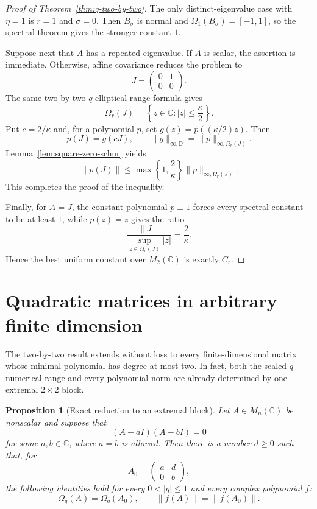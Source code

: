 \documentclass[11pt]{article}
\newtheorem{proposition}[theorem]{Proposition}
\theoremstyle{remark}
\begin{document}
\begin{proof}[Proof of Theorem~\ref{thm:q-two-by-two}]
The only distinct-eigenvalue case with \(\eta=1\) is
\(r=1\) and \(\sigma=0\).  Then \(B_\sigma\) is normal and
\(\Omega_1(B_\sigma)=[-1,1]\), so the spectral theorem gives the
stronger constant \(1\).

Suppose next that \(A\) has a repeated eigenvalue.  If \(A\) is scalar,
the assertion is immediate.  Otherwise, affine covariance reduces the
problem to
\[
  J=
  \begin{pmatrix}
    0&1\\
    0&0
  \end{pmatrix}.
\]
The same two-by-two \(q\)-elliptical range formula gives
\[
  \Omega_r(J)=
  \left\{z\in\mathbb C:|z|\leq\frac{\kappa}{2}\right\}.
\]
Put \(c=2/\kappa\) and, for a polynomial \(p\), set
\(g(z)=p((\kappa/2)z)\).  Then
\[
  p(J)=g(cJ),\qquad
  \|g\|_{\infty,\mathbb D}
  =\|p\|_{\infty,\Omega_r(J)}.
\]
Lemma~\ref{lem:square-zero-schur} yields
\[
  \|p(J)\|
  \leq
  \max\left\{1,\frac{2}{\kappa}\right\}
  \|p\|_{\infty,\Omega_r(J)}.
\]
This completes the proof of the inequality.

Finally, for \(A=J\), the constant polynomial \(p\equiv1\) forces every
spectral constant to be at least \(1\), while \(p(z)=z\) gives the
ratio
\[
  \frac{\|J\|}
       {\sup_{z\in\Omega_r(J)}|z|}
  =\frac{2}{\kappa}.
\]
Hence the best uniform constant over \(M_2(\mathbb C)\) is exactly
\(C_r\).
\end{proof}

 
\section{Quadratic matrices in arbitrary finite dimension}
\label{sec:q-quadratic}

The two-by-two result extends without loss to every finite-dimensional
matrix whose minimal polynomial has degree at most two.  In fact, both
the scaled \(q\)-numerical range and every polynomial norm are already
determined by one extremal \(2\times2\) block.

\begin{proposition}[Exact reduction to an extremal block]
\label{prop:quadratic-reduction}
Let \(A\in M_n(\mathbb C)\) be nonscalar and suppose that
\[
  (A-aI)(A-bI)=0
\]
for some \(a,b\in\mathbb C\), where \(a=b\) is allowed.  Then there is
a number \(d\geq0\) such that, for
\[
  A_0=
  \begin{pmatrix}
    a&d\\
    0&b
  \end{pmatrix},
\]
the following identities hold for every \(0<|q|\leq1\) and every
complex polynomial \(f\):
\[
  \Omega_q(A)=\Omega_q(A_0),
  \qquad
  \|f(A)\|=\|f(A_0)\|.
\]
\end{proposition}
\end{document}

